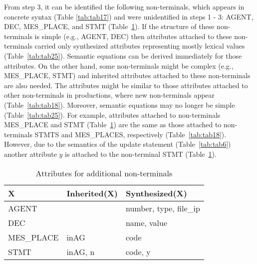 \documentclass[preprint, prX]{revtex4}
\begin{document}
From step 3, it can be identified the following non-terminals, which appears in concrete syntax (Table \ref{tab:tab17}) and were unidentified in steps 1 - 3: AGENT, DEC, MES\_\-PLACE, and STMT (Table~\ref{tab:tab24}). If the structure of these non-terminals is simple (e.g., AGENT, DEC) then attributes attached to these non-terminals carried only synthesized attributes representing mostly lexical values (Table~\ref{tab:tab25}). Semantic equations can be derived immediately for those attributes. On the other hand, some non-terminals might be complex (e.g., MES\_\-PLACE, STMT) and inherited attributes attached to these non-terminals are also needed. The attributes might be similar to those attributes attached to other non-terminals in productions, where new non-terminals appear (Table~\ref{tab:tab18}). Moreover, semantic equations may no longer be simple (Table~\ref{tab:tab25}). For example, attributes attached to non-terminals MES\_\-PLACE and STMT (Table~\ref{tab:tab24}) are the same as those attached to non-terminals STMTS and MES\_PLACES, respectively (Table~\ref{tab:tab18}). However, due to the semantics of the update statement (Table~\ref{tab:tab6}) another attribute $y$ is attached to the non-terminal STMT (Table~\ref{tab:tab24}).

\begin{table}[htb]           \caption{Attributes for additional non-terminals}
\label{tab:tab24}
\vspace{-5mm}
\footnotesize
\begin{center}
\begin{tabular}{ | l | l | l | }
\hline
X          &   Inherited(X)  &       Synthesized(X) \\
\hline
AGENT      &                 &      number, type, file\_ip \\
DEC        &                 &      name, value \\
MES\_PLACE  &  inAG           &         code \\
STMT       &  inAG, n        &         code, y \\
\hline
\end{tabular}
\end{center}
\normalsize
\vspace{-5mm}
\end{table}
\end{document}
